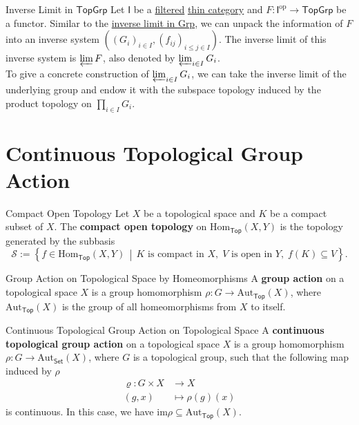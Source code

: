 \documentclass{report}
\newcommand{\midv}{\,\middle\vert\,}
\begin{document}
\begin{definition}{Inverse Limit in $\mathsf{TopGrp}$}{}
	Let $\mathsf{I}$ be a \hyperref[th:filtered_category]{filtered} \hyperref[th:thin_category]{thin category} and $F:\mathsf{I}^{\mathrm{op}}\to \mathsf{TopGrp}$ be a functor. Similar to the \hyperref[th:inverse_limit_of_groups]{inverse limit in \textsf{Grp}}, we can unpack the information of $F$ into an inverse system $\left(\left(G_i\right)_{i \in I},\left(f_{i j}\right)_{i \leq j \in I}\right)$. The inverse limit of this inverse system is $\varprojlim F$, also denoted by $\varprojlim_{i\in I}G_i$.\\
	To give a concrete construction of $\varprojlim_{i\in I}G_i$, we can take the inverse limit of the underlying group and endow it with the subspace topology induced by the product topology on $\prod_{i\in I}G_i$.
\end{definition}


\section{Continuous Topological Group Action}
\begin{definition}{Compact Open Topology}{}
	Let $X$ be a topological space and $K$ be a compact subset of $X$. The \textbf{compact open topology} on $\mathrm{Hom}_{\mathsf{Top}}(X,Y)$ is the topology generated by the subbasis
	\[
		\mathcal{S}:=\left\{f\in \mathrm{Hom}_{\mathsf{Top}}(X,Y)\midv K\text{ is compact in }X,\;V\text{ is open in }Y,\;f(K)\subseteq V\right\}.
	\]
\end{definition}


\begin{definition}{Group Action on Topological Space by Homeomorphisms}{}
	A \textbf{group action} on a topological space $X$ is a group homomorphism $\rho:G\to \mathrm{Aut}_{\mathsf{Top}}(X)$, where $\mathrm{Aut}_{\mathsf{Top}}(X)$ is the group of all homeomorphisms from $X$ to itself.
\end{definition}


\begin{definition}{Continuous Topological Group Action on Topological Space}{}
	A \textbf{continuous topological group action} on a topological space $X$ is a group homomorphism $\rho:G\to \mathrm{Aut}_{\mathsf{Set}}(X)$, where $G$ is a topological group, such that the following map induced by $\rho$
	\begin{align*}
		\varrho:G\times X & \longrightarrow X      \\
		(g,x)             & \longmapsto \rho(g)(x)
	\end{align*}
	is continuous. In this case, we have $\mathrm{im}\rho \subseteq \mathrm{Aut}_{\mathsf{Top}}(X)$.
\end{definition}
\end{document}
